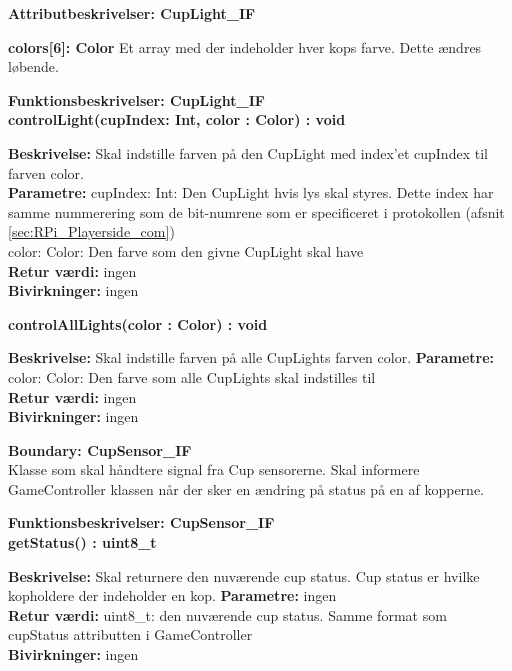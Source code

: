 \documentclass[Arkitektur/System_main.tex]{subfiles}
\begin{document}
{\large\textbf{Attributbeskrivelser: CupLight\_IF}}
\begin{adjustwidth}{1cm}{0pt}
\textbf{colors[6]: Color } Et array med der indeholder hver kops farve. Dette ændres løbende. \\[0.2cm]
\end{adjustwidth}
{\large\textbf{Funktionsbeskrivelser: CupLight\_IF}}\\[0.2cm]
\textbf{controlLight(cupIndex: Int, color : Color) : void}
\begin{adjustwidth}{1cm}{0pt}
\textbf{Beskrivelse:} Skal indstille farven på den CupLight med index'et cupIndex til farven color. \\[0.2cm]
\textbf{Parametre:}  cupIndex: Int: Den CupLight hvis lys skal styres. Dette index har samme nummerering som de bit-numrene som er specificeret i protokollen (afsnit \ref{sec:RPi_Playerside_com}) \\color: Color: Den farve som den givne CupLight skal have \\[0.2cm]
\textbf{Retur værdi:} ingen \\[0.2cm]
\textbf{Bivirkninger:} ingen \\[0.2cm]
\end{adjustwidth}
\textbf{controlAllLights(color : Color) : void}
\begin{adjustwidth}{1cm}{0pt}
\textbf{Beskrivelse:} Skal indstille farven på alle CupLights farven color.
\textbf{Parametre:} color: Color: Den farve som alle CupLights skal indstilles til \\[0.2cm]
\textbf{Retur værdi:} ingen \\[0.2cm]
\textbf{Bivirkninger:} ingen \\[0.2cm]
\end{adjustwidth}


{\large\textbf{Boundary:  CupSensor\_IF}}\\
Klasse som skal håndtere signal fra Cup sensorerne. Skal informere GameController klassen når der sker en ændring på status på en af kopperne.

{\large\textbf{Funktionsbeskrivelser: CupSensor\_IF}}\\[0.2cm]
\textbf{getStatus() : uint8\_t}
\begin{adjustwidth}{1cm}{0pt}
\textbf{Beskrivelse:} Skal returnere den nuværende cup status. Cup status er hvilke kopholdere der indeholder en kop.
\textbf{Parametre:} ingen \\[0.2cm]
\textbf{Retur værdi:} uint8\_t: den nuværende cup status. Samme format som cupStatus attributten i GameController \\[0.2cm]
\textbf{Bivirkninger:} ingen \\[0.2cm]
\end{adjustwidth}
\end{document}
